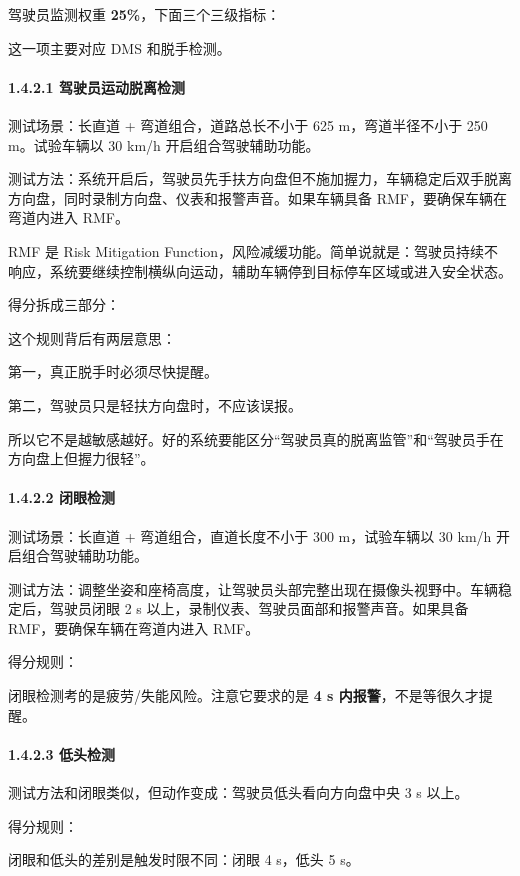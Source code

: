 驾驶员监测权重 \textbf{25\%}，下面三个三级指标：

这一项主要对应 DMS 和脱手检测。

\paragraph{1.4.2.1 驾驶员运动脱离检测}

测试场景：长直道 + 弯道组合，道路总长不小于 625 m，弯道半径不小于 250 m。试验车辆以 30 km/h 开启组合驾驶辅助功能。

测试方法：系统开启后，驾驶员先手扶方向盘但不施加握力，车辆稳定后双手脱离方向盘，同时录制方向盘、仪表和报警声音。如果车辆具备 RMF，要确保车辆在弯道内进入 RMF。

RMF 是 Risk Mitigation Function，风险减缓功能。简单说就是：驾驶员持续不响应，系统要继续控制横纵向运动，辅助车辆停到目标停车区域或进入安全状态。

得分拆成三部分：

这个规则背后有两层意思：

第一，真正脱手时必须尽快提醒。

第二，驾驶员只是轻扶方向盘时，不应该误报。 

所以它不是越敏感越好。好的系统要能区分“驾驶员真的脱离监管”和“驾驶员手在方向盘上但握力很轻”。

\paragraph{1.4.2.2 闭眼检测}

测试场景：长直道 + 弯道组合，直道长度不小于 300 m，试验车辆以 30 km/h 开启组合驾驶辅助功能。

测试方法：调整坐姿和座椅高度，让驾驶员头部完整出现在摄像头视野中。车辆稳定后，驾驶员闭眼 2 s 以上，录制仪表、驾驶员面部和报警声音。如果具备 RMF，要确保车辆在弯道内进入 RMF。

得分规则：

闭眼检测考的是疲劳/失能风险。注意它要求的是 \textbf{4 s 内报警}，不是等很久才提醒。

\paragraph{1.4.2.3 低头检测}

测试方法和闭眼类似，但动作变成：驾驶员低头看向方向盘中央 3 s 以上。

得分规则：

闭眼和低头的差别是触发时限不同：闭眼 4 s，低头 5 s。

